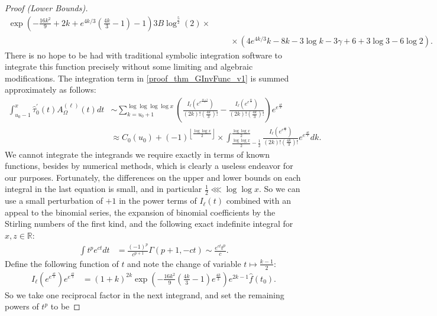 \documentclass[11pt,reqno,a4letter]{article}
\numberwithin{figure}{section}
\numberwithin{table}{section}
\newcommand{\Floor}[2]{\ensuremath{\left\lfloor \frac{#1}{#2} \right\rfloor}}
\theoremstyle{plain}
\numberwithin{theorem}{section}
\theoremstyle{definition}
\begin{document}
\begin{proof}[Proof (Lower Bounds)]
\begin{align*}
{     \exp \left(-\frac{16 k^2}{9}+2k+e^{4k/3} 
     \left(\frac{4k}{3}-1\right)-1\right)}{3B \log ^{\frac{5}{2}}(2)} \times \\ 
     & \phantom{=\ } \times 
     \left(4 e^{4 k/3} k-8k-3 \log k-3 \gamma +6+3 
     \log 3-6 \log 2\right).
\end{align*} 
There is no hope to be had with traditional symbolic integration software to integrate 
this function precisely without some limiting and algebraic modifications. The integration term 
in \eqref{proof_thm_GInvFunc_v1} is summed approximately as follows: 
\begin{align*} 
\int_{u_0-1}^{x} \widehat{\tau}_0^{\prime}(t) A_{\Omega}^{(\ell)}(t) dt & \sim 
     \sum_{k=u_0+1}^{\log\log\log\log x} \left( 
     \frac{I_{\ell}\left(e^{e^{\frac{4k+2}{3}}}\right)}{(2k)! \left(\frac{4k}{3}\right)!} - 
     \frac{I_{\ell}\left(e^{e^{\frac{4k}{3}}}\right)}{(2k)! \left(\frac{4k}{3}\right)!}
     \right) e^{e^{\frac{4k}{3}}} \\ 
     & \approx 
     C_0(u_0) + 
     (-1)^{\Floor{\log\log x}{2}} \times 
     \int_{\frac{\log\log x}{2}-\frac{1}{2}}^{\frac{\log\log x}{2}} 
     \frac{I_{\ell}\left(e^{e^{\frac{4k}{3}}}\right)}{(2k)! \left(\frac{4k}{3}\right)!} 
     e^{e^{\frac{4k}{3}}} dk. 
\end{align*} 
We cannot integrate the integrands we require exactly in terms of known functions, besides by 
numerical methods, which is clearly a useless endeavor for our purposes. Fortunately, the 
differences on the upper and lower bounds on each integral in the last equation 
is small, and in particular $\frac{1}{2} \lll \log\log x$. 
So we can use a small perturbation of $+1$ in the power terms of $I_{\ell}(t)$ combined with 
an appeal to the binomial series, the expansion of binomial coefficients by the Stirling numbers 
of the first kind, and the following exact indefinite integral for $x,z \in \mathbb{R}$: 
\begin{align*} 
\int t^p e^{ct} dt & = \frac{(-1)^p}{c^{p+1}} \Gamma(p+1, -ct) \sim 
     \frac{e^{ct} t^p}{c}. 
\end{align*} 
Define the following function of $t$ and note the change of variable $t \mapsto \frac{k-1}{2}$: 
\begin{align*} 
I_{\ell}\left(e^{e^{\frac{4k}{3}}}\right) e^{e^{\frac{4k}{3}}} & = 
     (1+k)^{2k} \exp\left(-\frac{16k^2}{9} \left(\frac{4k}{3}-1\right) e^{\frac{4k}{3}}\right) 
     e^{2k-1} \widehat{f}(t_0). 
\end{align*} 
So we take one reciprocal factor in the next integrand, and set the remaining powers of $t^p$ to be 

\end{proof}
\end{document}
